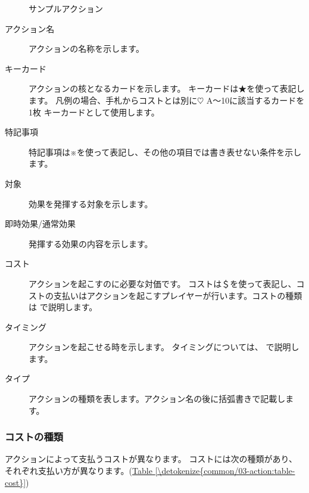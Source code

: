 \documentclass[letterpaper,10pt,dvipdfmx]{sphinxmanual}
\begin{document}
\begin{figure}[htbp]
\centering
\capstart

\noindent{}
\caption{サンプルアクション}\label{\detokenize{common/03-action:id32}}\label{\detokenize{common/03-action:action-sample}}\end{figure}
\begin{description}
\item[{アクション名}] \leavevmode
アクションの名称を示します。

\item[{キーカード}] \leavevmode
アクションの核となるカードを示します。
キーカードは★を使って表記します。
凡例の場合、手札からコストとは別に{\normalsize $\heartsuit$} A〜10に該当するカードを1枚
キーカードとして使用します。

\item[{特記事項}] \leavevmode
特記事項は※を使って表記し、その他の項目では書き表せない条件を示します。

\item[{対象}] \leavevmode
効果を発揮する対象を示します。

\item[{即時効果/通常効果}] \leavevmode
発揮する効果の内容を示します。

\item[{コスト}] \leavevmode
アクションを起こすのに必要な対価です。
コストは＄を使って表記し、コストの支払いはアクションを起こすプレイヤーが行います。コストの種類は {\hyperref[\detokenize{common/03-action:cost}]{}} で説明します。

\item[{タイミング}] \leavevmode
アクションを起こせる時を示します。
タイミングについては、 {\hyperref[\detokenize{common/03-action:action-chance}]{}} で説明します。

\item[{タイプ}] \leavevmode
アクションの種類を表します。アクション名の後に括弧書きで記載します。

\end{description}


\subsubsection{コストの種類}
\label{\detokenize{common/03-action:cost}}\label{\detokenize{common/03-action:id3}}
アクションによって支払うコストが異なります。
コストには次の種類があり、それぞれ支払い方が異なります。(\hyperref[\detokenize{common/03-action:table-cost}]{Table \ref{\detokenize{common/03-action:table-cost}}})
\end{document}
